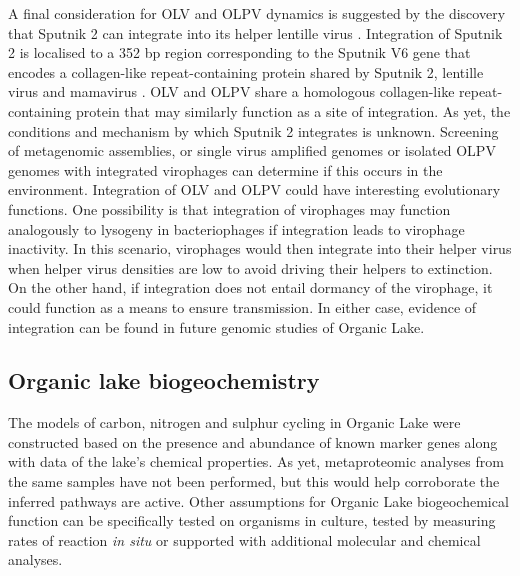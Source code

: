 A final consideration for \ac{OLV} and \ac{OLPV} dynamics is suggested by the discovery that Sputnik 2 can integrate into its helper lentille virus \cite{Desnues2012}.
Integration of Sputnik 2 is localised to a 352 bp region corresponding to the Sputnik V6 gene that encodes a collagen-like repeat-containing protein shared by Sputnik 2, lentille virus and mamavirus  \cite{Desnues2012}. 
\ac{OLV} and \ac{OLPV} share a homologous collagen-like repeat-containing protein that may similarly function as a site of integration.
As yet, the conditions and mechanism by which Sputnik 2 integrates is unknown.
Screening of metagenomic assemblies, or single virus amplified genomes or isolated \ac{OLPV} genomes with integrated virophages can determine if this occurs in the environment.
Integration of \ac{OLV} and \ac{OLPV} could have interesting evolutionary functions.
One possibility is that integration of virophages may function analogously to lysogeny in bacteriophages if integration leads to virophage inactivity.
In this scenario, virophages would then integrate into their helper virus when helper virus densities are low to avoid driving their helpers to extinction.
On the other hand, if integration does not entail dormancy of the virophage, it could function as a means to ensure transmission.
In either case, evidence of integration can be found in future genomic studies of Organic Lake.

\subsection{Organic lake biogeochemistry}
The models of carbon, nitrogen and sulphur cycling in Organic Lake were constructed based on the presence and abundance of known marker genes  along with data of the lake's chemical properties.
As yet, metaproteomic analyses from the same samples have not been performed, but this would help corroborate the inferred pathways are active. 
Other assumptions for Organic Lake biogeochemical function can be specifically tested on organisms in culture, tested by measuring rates of reaction \emph{in situ} or supported with additional molecular and chemical analyses.

